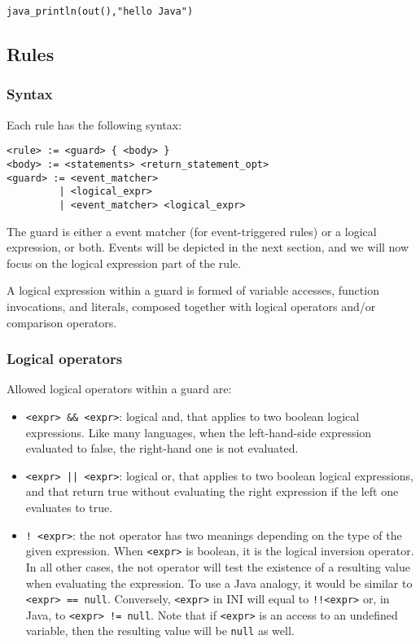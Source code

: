 \documentclass[11pt]{article}
\begin{document}
\begin{verbatim}
java_println(out(),"hello Java")
\end{verbatim}

\subsection{Rules}

\subsubsection{Syntax}

Each rule has the following syntax:

\begin{verbatim}
<rule> := <guard> { <body> }
<body> := <statements> <return_statement_opt>
<guard> := <event_matcher>
         | <logical_expr>
         | <event_matcher> <logical_expr>
\end{verbatim}

The guard is either a event matcher (for event-triggered rules) or a logical expression, or both. Events will be depicted in the next section, and we will now focus on the logical expression part of the rule.

A logical expression within a guard is formed of variable accesses, function invocations, and literals, composed together with logical operators and/or comparison operators.

\subsubsection{Logical operators}

Allowed logical operators within a guard are:

\begin{itemize}
\item \texttt{<expr> \&\& <expr>}: logical and, that applies to two boolean logical expressions. Like many languages, when the left-hand-side expression evaluated to false, the right-hand one is not evaluated.
\item \texttt{<expr> || <expr>}: logical or, that applies to two boolean logical expressions, and that return true without evaluating the right expression if the left one evaluates to true.
\item \texttt{! <expr>}: the not operator has two meanings depending on the type of the given expression. When \texttt{<expr>} is boolean, it is the logical inversion operator. In all other cases, the not operator will test the existence of a resulting value when evaluating the expression. To use a Java analogy, it would be similar to \texttt{<expr> == null}. Conversely, \texttt{<expr>} in INI will equal to \texttt{!!<expr>} or, in Java, to \texttt{<expr> != null}. Note that if \texttt{<expr>} is an access to an undefined variable, then the resulting value will be \texttt{null} as well.
\end{itemize}
\end{document}
